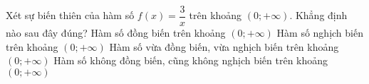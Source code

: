 \begin{ex}%
	Xét sự biến thiên của hàm số $f(x)=\dfrac{3}{x}$ trên khoảng $(0;+\infty)$. Khẳng định nào sau đây đúng?
	\choice
	{Hàm số đồng biến trên khoảng $\left(0;+\infty \right)$}
	{\True Hàm số nghịch biến trên khoảng $\left(0;+\infty \right)$}
	{Hàm số vừa đồng biến, vừa nghịch biến trên khoảng $\left(0;+\infty \right)$}
	{Hàm số không đồng biến, cũng không nghịch biến trên khoảng $\left(0;+\infty \right)$}
\end{ex}
